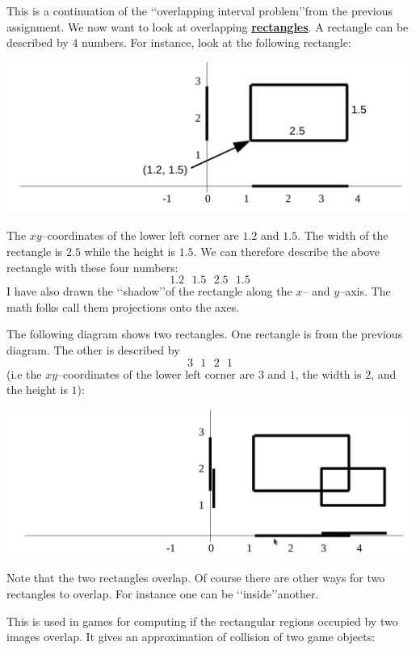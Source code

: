 This is a continuation of the \lq\lq overlapping interval problem\rq\rq from 
the previous assignment. We now want to look at overlapping
{\bf \underline{rectangles}}. A rectangle can be described by $4$ numbers.
For instance, look at the following rectangle:

\includegraphics[width=6 in, height=2 in]{a06q05/question/figure1.png}

The $xy$--coordinates of the lower left corner are $1.2$ and $1.5$. The width 
of the rectangle is $2.5$ while the height is $1.5$. We can therefore describe
the above rectangle with these four numbers:
\[ 1.2 \,\,\,\, 1.5 \,\,\,\, 2.5 \,\,\,\, 1.5 \]
I have also drawn the \lq\lq shadow\rq\rq of the rectangle along the $x$-- and
$y$--axis. The math folks call them projections onto the axes.

The following diagram shows two rectangles. One rectangle is from the previous 
diagram. The other is described by
\[ 3 \,\,\,\, 1 \,\,\,\, 2 \,\,\,\, 1 \]
(i.e the $xy$--coordinates 
of the lower left corner are $3$ and $1$, the width is $2$, 
and the height is $1$):

\includegraphics[width=6 in, height=2 in]{a06q05/question/figure2.png}

Note that the two rectangles overlap. Of course there are other ways for two 
rectangles to overlap. For instance one can be \lq\lq inside\rq\rq another.

This is used in games for computing if the rectangular regions occupied by two 
images overlap. It gives an approximation of collision of two game objects:

